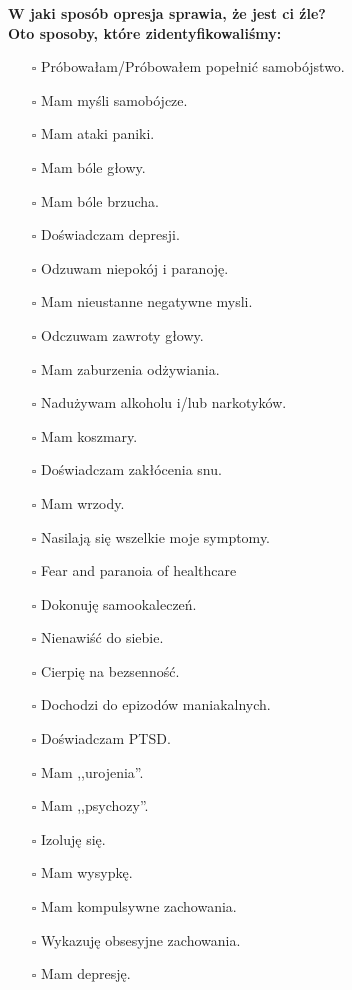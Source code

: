 \noindent\textcolor{ProcessBlue}{\textbf{\Large{W jaki sposób opresja sprawia, że jest ci źle?}}}\\
\textbf{\large{Oto sposoby, które zidentyfikowaliśmy:}}
\begin{multicols}{2}
\begin{itemize}
\item[$\square$]{Próbowałam/Próbowałem popełnić samobójstwo.}
\item[$\square$]{Mam myśli samobójcze.}
\item[$\square$]{Mam ataki paniki.}
\item[$\square$]{Mam bóle głowy.}
\item[$\square$]{Mam bóle brzucha.}
\item[$\square$]{Doświadczam depresji.}
\item[$\square$]{Odzuwam niepokój i paranoję.}
\item[$\square$]{Mam nieustanne negatywne mysli.}
\item[$\square$]{Odczuwam zawroty głowy.}
\item[$\square$]{Mam zaburzenia odżywiania.}
\item[$\square$]{Nadużywam alkoholu i/lub narkotyków.}
\item[$\square$]{Mam koszmary.}
\item[$\square$]{Doświadczam zakłócenia snu.}
\item[$\square$]{Mam wrzody.}
\item[$\square$]{Nasilają się wszelkie moje symptomy.}
\item[$\square$]{Fear and paranoia of healthcare}
\item[$\square$]{Dokonuję samookaleczeń.}
\item[$\square$]{Nienawiść do siebie.}
\item[$\square$]{Cierpię na bezsenność.}
\item[$\square$]{Dochodzi do epizodów maniakalnych.}
\item[$\square$]{Doświadczam PTSD.}
\item[$\square$]{Mam ,,urojenia''.}
\item[$\square$]{Mam ,,psychozy''.}
\item[$\square$]{Izoluję się.}
\item[$\square$]{Mam wysypkę.}
\item[$\square$]{Mam kompulsywne zachowania.}
\item[$\square$]{Wykazuję obsesyjne zachowania.}
\item[$\square$]{Mam depresję.}
\end{itemize}
\end{multicols}


